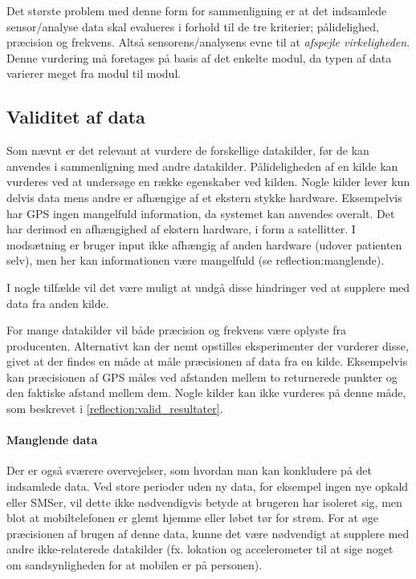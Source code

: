Det største problem med denne form for sammenligning er at det indsamlede sensor/analyse data skal evalueres i forhold til de tre kriterier; pålidelighed, præcision og frekvens.
Altså sensorens/analysens evne til at \textit{afspejle virkeligheden}.
Denne vurdering må foretages på basis af det enkelte modul, da typen af data varierer meget fra modul til modul.

\subsection{Validitet af data}
Som nævnt er det relevant at vurdere de forskellige datakilder, før de kan anvendes i sammenligning med andre datakilder.
Pålideligheden af en kilde kan vurderes ved at undersøge en række egenskaber ved kilden.
Nogle kilder lever kun delvis data mens andre er afhængige af et ekstern stykke hardware.
Eksempelvis har GPS ingen mangelfuld information, da systemet kan anvendes overalt.
Det har derimod en afhængighed af ekstern hardware, i form a satellitter.
I modsætning er bruger input ikke afhængig af anden hardware (udover patienten selv), men her kan informationen være mangelfuld (se reflection:manglende).

I nogle tilfælde vil det være muligt at undgå disse hindringer ved at supplere med data fra anden kilde.

For mange datakilder vil både præcision og frekvens være oplyste fra producenten.
Alternativt kan der nemt opstilles eksperimenter der vurderer disse, givet at der findes en måde at måle præcisionen af data fra en kilde.
Eksempelvis kan præcisionen af GPS måles ved afstanden mellem to returnerede punkter og den faktiske afstand mellem dem.
Nogle kilder kan ikke vurderes på denne måde, som beskrevet i \cref{reflection:valid_resultater}.

\paragraph{Manglende data}
Der er også sværere overvejelser, som hvordan man kan konkludere på det indsamlede data.
Ved store perioder uden ny data, for eksempel ingen nye opkald eller SMSer, vil dette ikke nødvendigvis betyde at brugeren har isoleret sig, men blot at mobiltelefonen er glemt hjemme eller løbet tør for strøm.
For at øge præcisionen af brugen af denne data, kunne det være nødvendigt at supplere med andre ikke-relaterede datakilder (fx. lokation og accelerometer til at sige noget om sandsynligheden for at mobilen er på personen).

